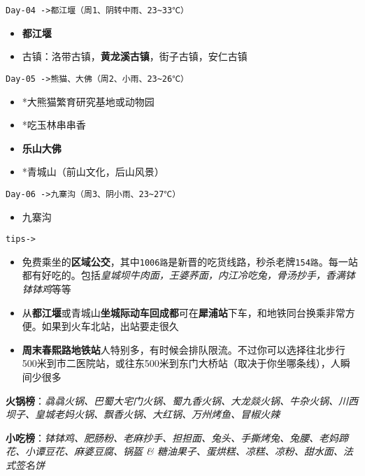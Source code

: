 \documentclass[UTF8,a4paper,8pt]{ctexart}
\begin{document}
 \verb|Day-04 ->都江堰（周1、阴转中雨、23~33℃）|
 \begin{itemize}[itemindent = 2em]
 	\item \textbf{都江堰}	 
 	\item 古镇：洛带古镇，\textbf{黄龙溪古镇}，街子古镇，安仁古镇	 	
 \end{itemize}
 
 \verb|Day-05 ->熊猫、大佛（周2、小雨、23~26℃）|
 \begin{itemize}[itemindent = 2em]
 	\item *大熊猫繁育研究基地或动物园
 	\item *吃玉林串串香
 	\item \textbf{乐山大佛 }	
 	\item *青城山（前山文化，后山风景）	
 \end{itemize}
 
 \verb|Day-06 ->九寨沟（周3、阴小雨、23~27℃）|
 \begin{itemize}[itemindent = 2em]
 	\item 九寨沟		 	
 \end{itemize}
 
 \verb|tips-> |
 \begin{itemize}[itemindent = 2em]
 	\item  免费乘坐的\textbf{区域公交}，其中\verb|1006路|是新晋的吃货线路，秒杀老牌\verb|154路|。每一站都有好吃的。包括\textit{皇城坝牛肉面，王婆荞面，内江冷吃兔，骨汤抄手，香满钵钵钵鸡}等等
 	\item  从\textbf{都江堰}或青城山\textbf{坐城际动车回成都}可在\textbf{犀浦站}下车，和地铁同台换乘非常方便。如果到火车北站，出站要走很久 
 	\item  \textbf{周末春熙路地铁站}人特别多，有时候会排队限流。不过你可以选择往北步行500米到市二医院站，或往东500米到东门大桥站（取决于你坐哪条线），人瞬间少很多 
 \end{itemize}
 
 \textbf{火锅榜}：\textit{骉骉火锅、巴蜀大宅门火锅、蜀九香火锅、大龙燚火锅、牛杂火锅、川西坝子、皇城老妈火锅、飘香火锅、大红锅、万州烤鱼、冒椒火辣}
 
 \textbf{小吃榜}：\textit{钵钵鸡、肥肠粉、老麻抄手、担担面、兔头、手撕烤兔、兔腰、老妈蹄花、小谭豆花、麻婆豆腐、锅盔 \& 糖油果子、蛋烘糕、凉糕、凉粉、甜水面、法式签名饼}
\end{document}

